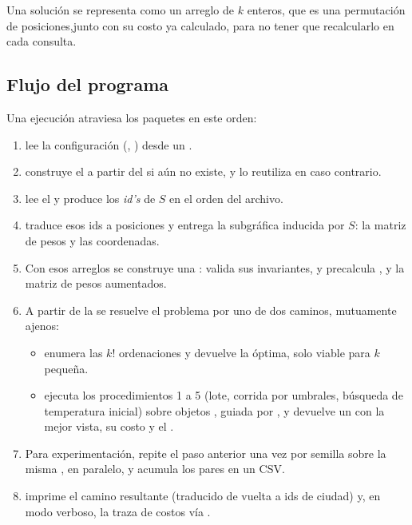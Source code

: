 \documentclass[9pt,a4paper,twocolumn,twoside]{tau-class/tau}
\begin{document}
    Una solución se representa como un arreglo de $k$ enteros, que es una permutación de posiciones,junto con su costo ya calculado, para no tener que recalcularlo en cada consulta.

    \subsection{Flujo del programa}

    Una ejecuci\'on atraviesa los paquetes en este orden:\\
    \begin{enumerate}
      \item {} lee la configuración (, ) desde un .
      \item {} construye el  a partir del  si aún no existe, y lo reutiliza en caso contrario.
      \item {} lee el  y produce los \textit{id's} de $S$ en el orden del archivo.
      \item {} traduce esos ids a posiciones y entrega la subgr\'afica inducida por $S$: la matriz de pesos y las coordenadas.
      \item Con esos arreglos se construye una : valida sus invariantes, y precalcula ,  y la matriz de pesos aumentados.
      \item A partir de la  se resuelve el problema por uno de dos caminos, mutuamente ajenos:
      \begin{itemize}
        \item {} enumera las $k!$ ordenaciones y devuelve la óptima, solo viable para $k$ pequeña.
        \item {} ejecuta los procedimientos 1 a 5 (lote, corrida por umbrales, búsqueda de temperatura inicial) sobre objetos , guiada por , y devuelve un  con la mejor  vista, su costo y el .
      \end{itemize}
      \item Para experimentación,  repite el paso anterior una vez por semilla sobre la misma , en paralelo, y  acumula los pares  en un CSV.
      \item {} imprime el camino resultante (traducido de vuelta a ids de ciudad) y, en modo verboso, la traza de costos vía .
    \end{enumerate}    
\end{document}
